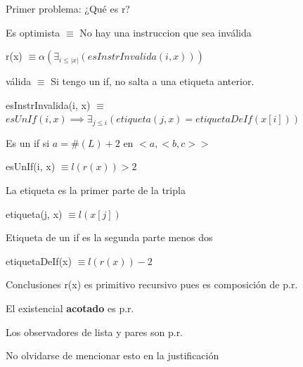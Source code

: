 \documentclass{beamer}
\begin{document}
\begin{frame}
	Primer problema: ¿Qué es r?
	
	\bigskip
	\pause

	\hfill Es optimista $\equiv$ No hay una instruccion que sea inválida 

	\medskip
	\pause


	r(x) $\equiv \alpha(\exists_{i \leq |x|}(esInstrInvalida(i, x))) $

	\bigskip
	\pause


	\hfill válida $\equiv$ Si tengo un if, no salta a una etiqueta anterior. 

	\medskip
	\pause


	esInstrInvalida(i, x) $ \equiv$ \\
	$esUnIf(i, x) \implies \exists_{j \leq i}(etiqueta(j, x) = etiquetaDeIf(x[i]) ) $

	\bigskip

	
\end{frame}
\begin{frame}
	
	\hfill Es un if si $a = \#(L) + 2$ en $<a, <b, c> >$ 

	\medskip
	\pause

	esUnIf(i, x) $ \equiv l(r(x)) > 2$

	\bigskip
	\pause

	\hfill La etiqueta es la primer parte de la tripla

	\medskip
	\pause

	etiqueta(j, x) $ \equiv l(x[j])$

	\bigskip
	\pause

	\hfill Etiqueta de un if es la segunda parte menos dos

	\medskip
	\pause

	etiquetaDeIf(x) $ \equiv l(r(x)) - 2$
\end{frame}

\begin{frame}{Conclusiones}
	r(x) es primitivo recursivo pues es composición de p.r.

	\bigskip

	El existencial \textbf{acotado} es p.r.

	\bigskip

	Los observadores de lista y pares son p.r.

	\bigskip
	\bigskip
	\bigskip

	No olvidarse de mencionar esto en la justificación

\end{frame}
\end{document}
